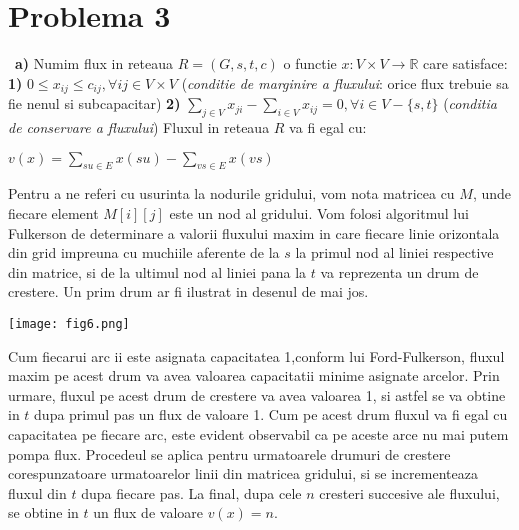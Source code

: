 \documentclass{article}
\begin{document}
\section{Problema 3}
\ 
\textbf{a)}
Numim flux in reteaua $R=(G,s,t,c)$ o functie $x:V\times V\rightarrow \mathbb{R}$ care satisface:
\newline
\newline
\textbf{1)} $0 \leq x_{ij} \leq c_{ij}, \forall ij \in V\times V$ (\textit{conditie de marginire a fluxului}: orice flux trebuie sa fie nenul si subcapacitar)
\newline
\textbf{2)} $\sum _{j \in V} x_{ji}-\sum_{i \in V}x_{ij}=0, \forall i \in V-\{s,t\}$ (\textit{conditia de conservare a fluxului})
\newline
\newline
Fluxul in reteaua $R$ va fi egal cu:
\begin{center}
$v(x)=\sum_{su \in E} x(su) -\sum_{vs \in E} x(vs)$
\end{center}
Pentru a ne referi cu usurinta la nodurile gridului, vom nota matricea cu $M$, unde fiecare element $M[i][j]$ este un nod al gridului.
\newline
\newline
Vom folosi algoritmul lui Fulkerson de determinare a valorii fluxului maxim in care fiecare linie orizontala din grid impreuna cu muchiile aferente de la $s$ la primul nod al liniei respective din matrice, si de la ultimul nod al liniei pana la $t$ va reprezenta un drum de crestere. Un prim drum ar fi ilustrat in desenul de mai jos. 
\begin{center}
\texttt{[image: fig6.png]}
\end{center}
Cum fiecarui arc ii este asignata capacitatea 1,conform lui Ford-Fulkerson, fluxul maxim pe acest drum va avea valoarea capacitatii minime asignate arcelor. Prin urmare, fluxul pe acest drum de crestere va avea valoarea 1, si astfel se va obtine in $t$ dupa primul pas un flux de valoare 1. Cum pe acest drum fluxul va fi egal cu capacitatea pe fiecare arc, este evident observabil ca pe aceste arce nu mai putem pompa flux.
\newline
\newline
Procedeul se aplica pentru urmatoarele drumuri de crestere corespunzatoare urmatoarelor linii din matricea gridului, si se incrementeaza fluxul din $t$ dupa fiecare pas. La final, dupa cele $n$ cresteri succesive ale fluxului, se obtine in $t$ un flux de valoare $v(x)=n$. 
\newline
\newline
\end{document}
